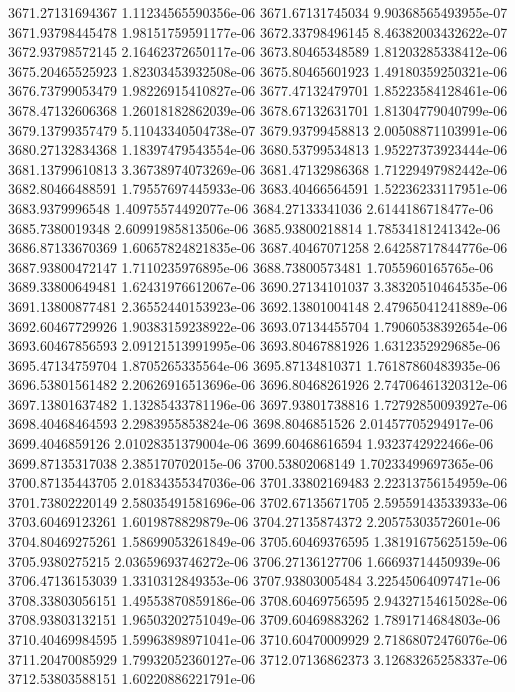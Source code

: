 {3671.27131694367 1.11234565590356e-06
3671.67131745034 9.90368565493955e-07
3671.93798445478 1.98151759591177e-06
3672.33798496145 8.46382003432622e-07
3672.93798572145 2.16462372650117e-06
3673.80465348589 1.81203285338412e-06
3675.20465525923 1.82303453932508e-06
3675.80465601923 1.49180359250321e-06
3676.73799053479 1.98226915410827e-06
3677.47132479701 1.85223584128461e-06
3678.47132606368 1.26018182862039e-06
3678.67132631701 1.81304779040799e-06
3679.13799357479 5.11043340504738e-07
3679.93799458813 2.00508871103991e-06
3680.27132834368 1.18397479543554e-06
3680.53799534813 1.95227373923444e-06
3681.13799610813 3.36738974073269e-06
3681.47132986368 1.71229497982442e-06
3682.80466488591 1.79557697445933e-06
3683.40466564591 1.52236233117951e-06
3683.9379996548 1.40975574492077e-06
3684.27133341036 2.6144186718477e-06
3685.7380019348 2.60991985813506e-06
3685.93800218814 1.78534181241342e-06
3686.87133670369 1.60657824821835e-06
3687.40467071258 2.64258717844776e-06
3687.93800472147 1.7110235976895e-06
3688.73800573481 1.7055960165765e-06
3689.33800649481 1.62431976612067e-06
3690.27134101037 3.38320510464535e-06
3691.13800877481 2.36552440153923e-06
3692.13801004148 2.47965041241889e-06
3692.60467729926 1.90383159238922e-06
3693.07134455704 1.79060538392654e-06
3693.60467856593 2.09121513991995e-06
3693.80467881926 1.6312352929685e-06
3695.47134759704 1.8705265335564e-06
3695.87134810371 1.76187860483935e-06
3696.53801561482 2.20626916513696e-06
3696.80468261926 2.74706461320312e-06
3697.13801637482 1.13285433781196e-06
3697.93801738816 1.72792850093927e-06
3698.40468464593 2.2983955853824e-06
3698.8046851526 2.01457705294917e-06
3699.4046859126 2.01028351379004e-06
3699.60468616594 1.9323742922466e-06
3699.87135317038 2.385170702015e-06
3700.53802068149 1.70233499697365e-06
3700.87135443705 2.01834355347036e-06
3701.33802169483 2.22313756154959e-06
3701.73802220149 2.58035491581696e-06
3702.67135671705 2.59559143533933e-06
3703.60469123261 1.6019878829879e-06
3704.27135874372 2.20575303572601e-06
3704.80469275261 1.58699053261849e-06
3705.60469376595 1.38191675625159e-06
3705.9380275215 2.03659693746272e-06
3706.27136127706 1.66693714450939e-06
3706.47136153039 1.3310312849353e-06
3707.93803005484 3.22545064097471e-06
3708.33803056151 1.49553870859186e-06
3708.60469756595 2.94327154615028e-06
3708.93803132151 1.96503202751049e-06
3709.60469883262 1.7891714684803e-06
3710.40469984595 1.59963898971041e-06
3710.60470009929 2.71868072476076e-06
3711.20470085929 1.79932052360127e-06
3712.07136862373 3.12683265258337e-06
3712.53803588151 1.60220886221791e-06
}
